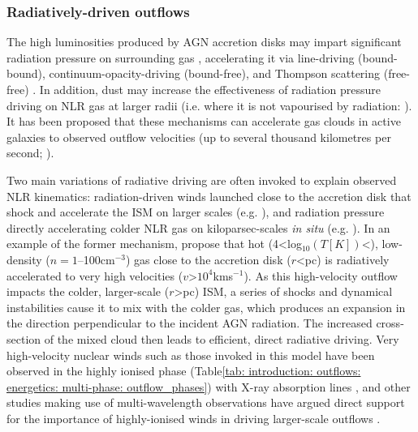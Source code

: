 \subsubsection{Radiatively-driven outflows}
\label{section: introduction: outflows: accleration_mechanisms: radiation}

The high luminosities produced by AGN accretion disks may impart significant radiation pressure on surrounding gas \citep{Castor1975, Abbott1982}, accelerating it via line-driving (bound-bound), continuum-opacity-driving (bound-free), and Thompson scattering (free-free) \citep{Arav1994, Murray1995, Proga1998, Proga2000}. In addition, dust may increase the effectiveness of radiation pressure driving on NLR gas at larger radii (i.e. where it is not vapourised by radiation: \citealt{Dopita2002, Fabian2006}). It has been proposed that these mechanisms can accelerate gas clouds in active galaxies to observed outflow velocities (up to several thousand kilometres per second; \citealt{Crenshaw2000_N1068, Crenshaw2000_N4151, King2003, Das2005, Das2006, Hopkins2010, King2010, MullerSanchez2011, Meena2021}). 

Two main variations of radiative driving are often invoked to explain observed NLR kinematics: radiation-driven winds launched close to the accretion disk that shock and accelerate the ISM on larger scales (e.g. \citealt{Elvis2000, Proga2000, King2003}), and radiation pressure directly accelerating colder NLR gas on kiloparsec-scales \textit{in situ} (e.g. \citealt{Das2007, Fischer2017, Revalski2018, Meena2021, Meena2023}). In an example of the former mechanism, \citet{Hopkins2010} propose that hot (4\;\textless\;log$_{10}(T [K])$\;\textless{}), low-density ($n=1$--100\;cm$^{-3}$) gas close to the accretion disk ($r$\;\textless{}\;pc) is radiatively accelerated to very high velocities ($v$\;\textgreater\;$10^4$\;km\;s\;$^{-1}$). As this high-velocity outflow impacts the colder, larger-scale ($r$\;\textgreater{}\;pc) ISM, a series of shocks and dynamical instabilities cause it to mix with the colder gas, which produces an expansion in the direction perpendicular to the incident AGN radiation. The increased cross-section of the mixed cloud then leads to efficient, direct radiative driving. Very high-velocity nuclear winds such as those invoked in this model have been observed in the highly ionised phase (Table\;\ref{tab: introduction: outflows: energetics: multi-phase: outflow_phases}) with X-ray absorption lines \citep{Pounds2004, Lobban2011, Pounds2011, Tombesi2011}, and other studies making use of multi-wavelength observations have argued direct support for the importance of highly-ionised winds in driving larger-scale outflows \citep{Pounds2013, Feruglio2015}.

